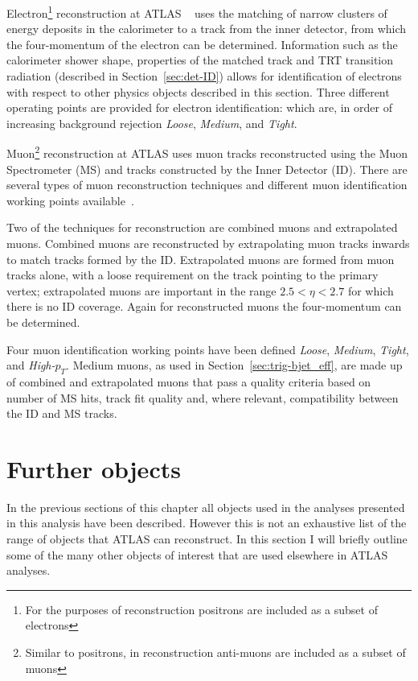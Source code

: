 Electron\footnote{For the purposes of reconstruction positrons are included as a subset of electrons}
reconstruction at ATLAS ~\cite{obj-electrons} uses
the matching of narrow clusters of energy deposits in the calorimeter
to a track from the inner detector,
from which the four-momentum of the electron can be determined.
Information such as the calorimeter shower shape,
properties of the matched track
and TRT transition radiation (described in Section~\ref{sec:det-ID})
allows for identification of electrons with respect to other physics objects described in this section.
Three different operating points are provided for electron identification:
which are, in order of increasing background rejection
\textit{Loose}, \textit{Medium}, and \textit{Tight}. 

Muon\footnote{Similar to positrons, in reconstruction anti-muons are included as a subset of muons}
reconstruction at ATLAS  uses muon tracks reconstructed using the Muon Spectrometer (MS) and tracks constructed by the Inner Detector (ID).
There are several types of muon reconstruction techniques
and different muon identification working points available~\cite{obj-muons}.

Two of the techniques for reconstruction are combined muons and extrapolated muons.
Combined muons are reconstructed by extrapolating muon tracks inwards to match tracks formed by the ID.
Extrapolated muons are formed from muon tracks alone,
with a loose requirement on the track pointing to the primary vertex;
extrapolated muons are important in the range $2.5 < \eta < 2.7$ for which there is no ID coverage.
Again for reconstructed muons the four-momentum can be determined.

Four muon identification working points have been defined \textit{Loose}, \textit{Medium}, \textit{Tight}, and \textit{High-$p_T$}.
Medium muons, as used in Section~\ref{sec:trig-bjet_eff}, are made up of combined and extrapolated muons that pass a quality criteria based on
number of MS hits, track fit quality and, where relevant, compatibility between the ID and MS tracks.

\section{Further objects}
\label{sec:obj-further}

In the previous sections of this chapter all objects used in the analyses presented in this analysis have been described.
However this is not an exhaustive list of the range of objects that ATLAS can reconstruct.
In this section I will briefly outline some of the many other objects of interest that are used elsewhere in ATLAS analyses.

